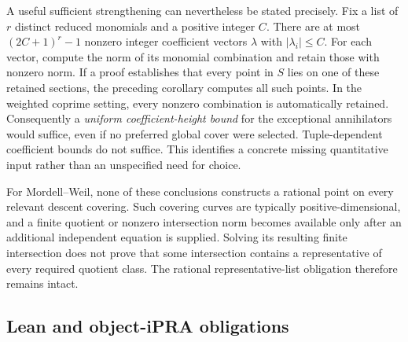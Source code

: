 A useful sufficient strengthening can nevertheless be stated
precisely.  Fix a list of \(r\) distinct reduced monomials and a
positive integer \(C\).  There are at most
\((2C+1)^r-1\) nonzero integer coefficient vectors
\(\lambda\) with \(|\lambda_i|\le C\).  For each vector, compute
the norm of its monomial combination and retain those with nonzero
norm.  If a proof establishes that every point in \(S\) lies on
one of these retained sections, the preceding corollary computes
all such points.  In the weighted coprime setting, every nonzero
combination is automatically retained.  Consequently a
\emph{uniform coefficient-height bound} for the exceptional
annihilators would suffice, even if no preferred global cover were
selected.  Tuple-dependent coefficient bounds do not suffice.
This identifies a concrete missing quantitative input rather than
an unspecified need for choice.

For Mordell--Weil, none of these conclusions constructs a rational
point on every relevant descent covering.  Such covering curves are
typically positive-dimensional, and a finite quotient or nonzero
intersection norm becomes available only after an additional
independent equation is supplied.  Solving its resulting finite
intersection does not prove that some intersection contains a
representative of every required quotient class.  The rational
representative-list obligation therefore remains intact.

\subsection{Lean and object-iPRA obligations}

